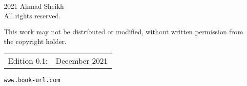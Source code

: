 \thispagestyle{empty}
\begingroup
\footnotesize
\parindent 0pt
\parskip \baselineskip
\textcopyright{} 2021 Ahmad Sheikh \\
All rights reserved.

    This work may not be distributed or modified, without written permission from the copyright holder.

\begin{center}
\begin{tabular}{ll}
Edition 0.1:  & December 2021
\end{tabular}
\end{center}

\vfill

\texttt{www.book-url.com}

\vspace*{2\baselineskip}


\endgroup
\clearpage
